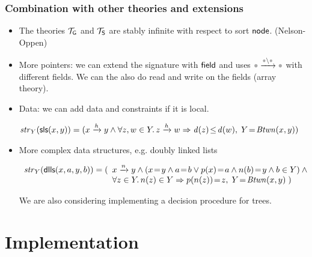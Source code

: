 \documentclass{beamer}
\begin{document}
\begin{frame}
  \frametitle{Combination with other theories and extensions}
  \begin{itemize}
  \item The theories $\graphtheory$ and $\settheory$ are stably infinite with respect to sort $\nodesort$. (Nelson-Oppen)

  \item More pointers: we can extend the signature with $\fldsort$ and uses $\reachsymf$ with different fields.
  We can the also do read and write on the fields (array theory).

  \item Data: we can add data and constraints if it is local. 

{\scriptsize
$\str{Y}{\mathsf{sls}(x,y)} = (\reachf{\mathit{h}}{x}{y} \land \forall z, w \in Y.\, \reachf{\mathit{h}}{z}{w} \Rightarrow \mathit{d}(z)\! \leq\! \mathit{d}(w), \; Y\!=\!\Btwn(x,y))$
}
  \item More complex data structures, e.g. doubly linked lists

{\scriptsize
$
\begin{array}{l}
\str{Y}{\mathsf{dlls}(x,a,y,b)} =
 ( \begin{array}[t]{l}
  \reachf{n}{x}{y} \land (x\!=\!y \land a\!=\!b \lor   p(x)\!=\!a \land n(b)\!=\!y \land b \in Y) \land {} \\
\forall z \in Y.\, n(z) \in Y \Rightarrow p(n(z))\!=\!z, \;
Y\!=\!\Btwn(x,y) \; )
\end{array}
\end{array}
$
}

  We are also considering implementing a decision procedure for trees.
 
  \end{itemize}
\end{frame}

\section{Implementation}
\subsection{\Tool}
\end{document}
